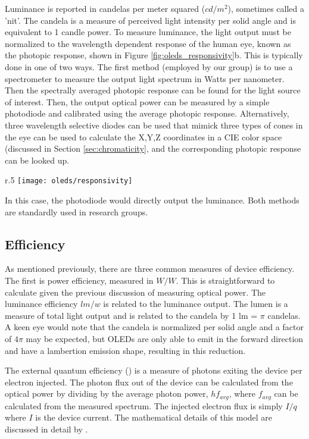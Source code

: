\documentclass[../thesis.tex]{subfiles}
\begin{document}
Luminance is reported in candelas per meter squared ($cd/m^2$), sometimes called a 'nit'.
The candela is a measure of perceived light intensity per solid angle and is equivalent to 1 candle power.
To measure luminance, the light output must be normalized to the wavelength dependent response of the human eye, known as the photopic response, shown in Figure \ref{fig:oleds_responsivity}b.
This is typically done in one of two ways.
The first method (employed by our group) is to use a spectrometer to measure the output light spectrum in Watts per nanometer.  
Then the spectrally averaged photopic response can be found for the light source of interest.
Then, the output optical power can be measured by a simple photodiode and calibrated using the average photopic response.
Alternatively, three wavelength selective diodes can be used that mimick three types of cones in the eye can be used to calculate the X,Y,Z coordinates in a CIE color space (discussed in Section \ref{sec:chromaticity}, and the corresponding photopic response can be looked up.
\begin{wrapfigure}{r}{.5\textwidth}
    \centering
    \texttt{[image: oleds/responsivity]}
\caption{(a) Silicon detector responsivity (b) Photopic response}
\label{fig:oleds_responsivity}
\end{wrapfigure}
In this case, the photodiode would directly output the luminance.
Both methods are standardly used in research groups.\supercite{Hershey2016,Inoue2016,Forrest2003}


\subsection{Efficiency}\label{sec:efficiency_analysis}

As mentioned previously, there are three common measures of device efficiency.  
The first is power efficiency, measured in $W/W$.
This is straightforward to calculate given the previous discussion of measuring optical power.
The luminance efficiency $lm/w$ is related to the luminance output.
The lumen is a measure of total light output and is related to the candela by 1 lm = $\pi$ candelas.
A keen eye would note that the candela is normalized per solid angle and a factor of $4\pi$ may be expected, but OLEDs are only able to emit in the forward direction and have a lambertion emission shape, resulting in this reduction.

The external quantum efficiency (\eqe) is a measure of photons exiting the device per electron injected.
The photon flux out of the device can be calculated from the optical power by dividing by the average photon power, $hf_{avg}$, where $f_{avg}$ can be calculated from the measured spectrum.
The injected electron flux is simply $I/q$ where $I$ is the device current.
The mathematical details of this model are discussed in detail by \textcite{Forrest2003}.%
\end{document}
